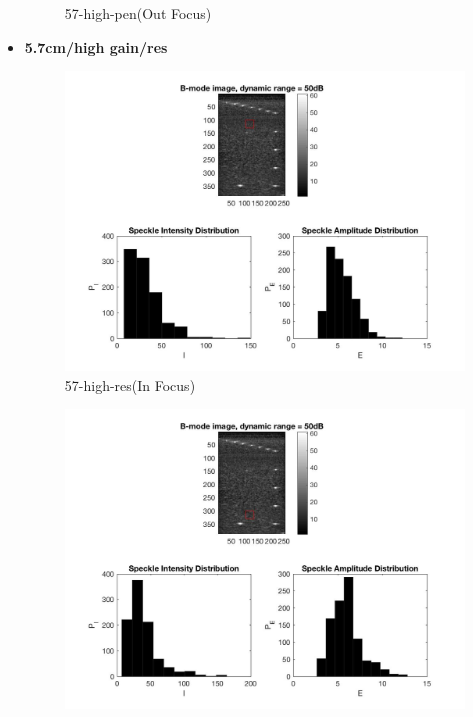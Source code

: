 \documentclass[12pts,a4paper]{article}
\begin{document}
\begin{itemize}
\begin{figure}[h]
    \caption{57-high-pen(Out Focus)}
    \label{fig:mesh1}
\end{figure}
\pagebreak
\item{\textbf{5.7cm/high gain/res}}
\begin{center}
\end{center}
\begin{figure}[h]
    \centering
    \includegraphics[width=1.0\textwidth]{img_hw2/57-high-res1.jpg}
    \caption{57-high-res(In Focus)}
    \label{fig:mesh1}
\end{figure}
\pagebreak
\begin{figure}[h]
    \centering
    \includegraphics[width=1.0\textwidth]{img_hw2/57-high-res2.jpg}

\end{figure}
\end{itemize}
\end{document}
